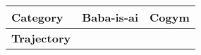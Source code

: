 \documentclass{article}
\begin{document}
	\begin{table}[!t]
		\centering
		\small
		\begin{tabular}{p{1.5cm}p{4cm}p{4cm}}
			\toprule Category                                                                                                                                                                                                                                                                                           & \textbf{Baba-is-ai}                                                                                                                                                                                                                                                                                                                                              & \textbf{Cogym} \\ %
			\midrule \textbf{Trajectory}                                                                                                                                                                                                                                                                                &                                                                                                                                                                                                                                                                                                                                                                  &                \\

\end{tabular}
\end{table}
\end{document}
